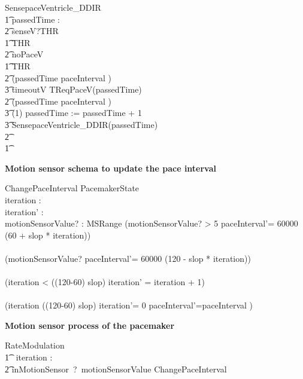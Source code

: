 \begin{circusaction}
SensepaceVentricle\_DDIR \circdef \\
\t1 \circvres passedTime : \nat \\
\t2 \circspot senseV?THR \then \\
\t1 \circif  THR  \circthen\\
\t2 noPaceV \then \Skip \\
\t1 \circelse \lnot  THR  \circthen\\
\t2 \circif  (passedTime \geq paceInterval ) \circthen \\
\t3 timeoutV \then TReqPaceV(passedTime)\\
\t2 \circelse \lnot (passedTime \geq paceInterval ) \circthen \\
\t3 \circwait(1) \circseq passedTime := passedTime + 1 \circseq \\
\t3 SensepaceVentricle\_DDIR(passedTime) \\
\t2 \circfi\\ 
\t1 \circfi \\ 
\end{circusaction}




\textbf{Motion sensor schema to update the pace interval} 

\begin{schema}{ChangePaceInterval}
\Delta PacemakerState \\
iteration : \nat \\
iteration' : \nat \\
motionSensorValue? : MSRange 
\where
(motionSensorValue? > 5 \land paceInterval'= 60000 \div (60 + slop * iteration))\\
\lor \\
(motionSensorValue?  \land paceInterval'= 60000 \div (120 - slop * iteration))\\
\land \\
(iteration < ((120-60) \div slop) \land iteration' = iteration + 1)   \\
\lor \\
(iteration \geq ((120-60) \div slop) \land iteration'= 0 \land paceInterval'=paceInterval ) \\  
\end{schema}

\textbf{Motion sensor process of the pacemaker} 

\begin{circusaction}
RateModulation \circdef \\
\t1 \circvres\ iteration :\nat  \circspot \\
\t2 inMotionSensor~?~motionSensorValue \then ChangePaceInterval
\end{circusaction}



